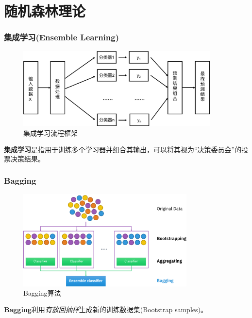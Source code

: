 \documentclass[10pt,aspectratio=43,mathserif]{beamer}
\begin{document}
\section[理论]{随机森林理论}

		\begin{frame}
		  \frametitle{\textbf{集成学习(Ensemble Learning)}}
            \begin{figure}[!t]
            \centering
            \includegraphics[width=4in]{figures/el.png}
            \caption{集成学习流程框架}
            \label{el}
            \end{figure}
            \textbf{集成学习}是指用于训练多个学习器并组合其输出，可以将其视为“决策委员会”的投票决策结果。
		\end{frame}

		\begin{frame}
		  \frametitle{\textbf{Bagging}}
            \begin{figure}[!t]
            \centering
            \includegraphics[width=3.5in]{figures/bagging.png}
            \caption{Bagging算法}
            \label{bagging}
            \end{figure}
            \textbf{Bagging}利用\textit{有放回抽样}生成新的训练数据集(Bootstrap samples)。
		\end{frame}
\end{document}
